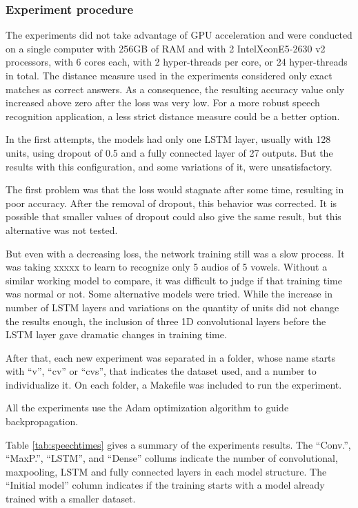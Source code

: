 \subsubsection{Experiment procedure}

The experiments did not take advantage of GPU acceleration and were  conducted on a single computer with 256GB of RAM and with 2 Intel\textregistered Xeon\textregistered E5-2630 v2 processors, with 6 cores each, with 2 hyper-threads per core, or 24 hyper-threads in total. 
The distance measure used in the experiments considered only exact matches as correct answers. As a consequence, the resulting accuracy value only increased above zero after the loss was very low. For a more robust speech recognition application, a less strict distance measure could be a better option.

In the first attempts, the models had only one LSTM layer, usually with 128 units, using dropout of 0.5 and a fully connected layer of 27 outputs. But the results with this configuration, and some variations of it, were unsatisfactory.

The first problem was that the loss would stagnate after some time, resulting in poor accuracy. After the removal of dropout, this behavior was corrected. It is possible that smaller values of dropout could also give the same result, but this alternative was not tested.

But even with a decreasing loss, the network training still was a slow process. It was taking xxxxx 
to learn to recognize only 5 audios of 5 vowels.
Without a similar working model to compare, it was difficult to judge if that training time was normal or not. Some alternative models were tried. While the increase in number of LSTM layers and variations on the quantity of units did not change the results enough, the inclusion of three 1D convolutional layers before the LSTM layer gave dramatic changes in training time.

After that, each new experiment was separated in a folder, whose name starts with ``v'', ``cv'' or ``cvs'', that indicates the dataset used, and a number to individualize it. On each folder, a Makefile was included to run the experiment.

All the experiments use the Adam
optimization algorithm to guide backpropagation.

Table \ref{tab:speechtimes} gives a summary of the experiments results. The ``Conv.'', ``MaxP.'', ``LSTM'', and ``Dense'' collums indicate the number of convolutional, maxpooling, LSTM and fully connected layers in each model structure. The ``Initial model'' column indicates if the training starts with a model already trained with a smaller dataset. 

